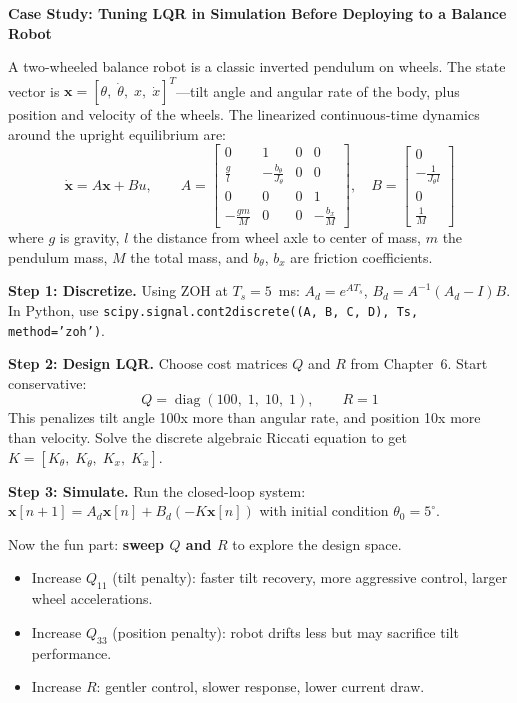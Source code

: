 \vspace{1em}
\begin{mdframed}[linewidth=1pt, innertopmargin=10pt, innerbottommargin=10pt]
\textbf{Case Study: Tuning LQR in Simulation Before Deploying to a Balance
Robot}

\vspace{0.3em}
A two-wheeled balance robot is a classic inverted pendulum on wheels. The state
vector is $\mathbf{x} = [\theta,\;\dot\theta,\;x,\;\dot x]^T$---tilt angle
and angular rate of the body, plus position and velocity of the wheels. The
linearized continuous-time dynamics around the upright equilibrium are:
\begin{equation}
\dot{\mathbf{x}} = A\mathbf{x} + Bu, \qquad
A = \begin{bmatrix}
0 & 1 & 0 & 0 \\
\frac{g}{l} & -\frac{b_\theta}{J_\theta} & 0 & 0 \\
0 & 0 & 0 & 1 \\
-\frac{g m}{M} & 0 & 0 & -\frac{b_x}{M}
\end{bmatrix}, \quad
B = \begin{bmatrix} 0 \\ -\frac{1}{J_\theta l} \\ 0 \\ \frac{1}{M} \end{bmatrix}
\end{equation}
where $g$ is gravity, $l$ the distance from wheel axle to center of mass, $m$
the pendulum mass, $M$ the total mass, and $b_\theta$, $b_x$ are friction
coefficients.

\textbf{Step 1: Discretize.} Using ZOH at $T_s = 5$~ms: $A_d = e^{A T_s}$,
$B_d = A^{-1}(A_d - I)B$. In Python, use
\texttt{scipy.signal.cont2discrete((A, B, C, D), Ts, method='zoh')}.

\textbf{Step 2: Design LQR.} Choose cost matrices $Q$ and $R$ from Chapter~6.
Start conservative:
\[
Q = \operatorname{diag}(100,\; 1,\; 10,\; 1), \qquad R = 1
\]
This penalizes tilt angle 100x more than angular rate, and position 10x more
than velocity. Solve the discrete algebraic Riccati equation to get
$K = [K_\theta,\; K_{\dot\theta},\; K_x,\; K_{\dot x}]$.

\textbf{Step 3: Simulate.} Run the closed-loop system:
$\mathbf{x}[n+1] = A_d \mathbf{x}[n] + B_d(-K\mathbf{x}[n])$ with initial
condition $\theta_0 = 5^\circ$.

Now the fun part: \textbf{sweep $Q$ and $R$} to explore the design space.
\begin{itemize}
    \item Increase $Q_{11}$ (tilt penalty): faster tilt recovery, more
          aggressive control, larger wheel accelerations.
    \item Increase $Q_{33}$ (position penalty): robot drifts less but may
          sacrifice tilt performance.
    \item Increase $R$: gentler control, slower response, lower current draw.
\end{itemize}


\end{mdframed}
